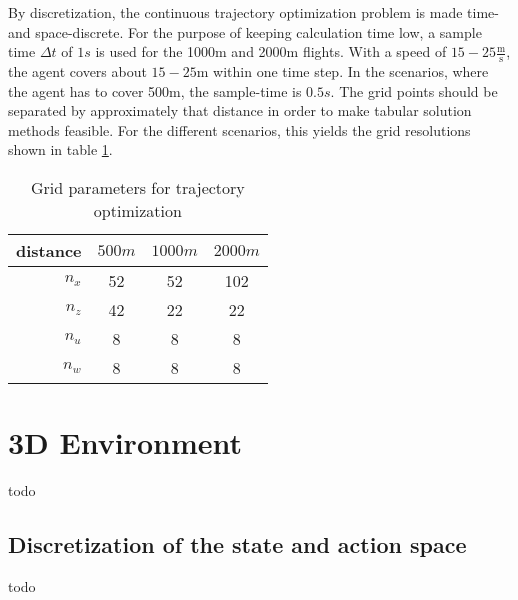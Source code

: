 By discretization, the continuous trajectory optimization problem is made time- and space-discrete. For the purpose of keeping calculation time low, a sample time $\Delta t$ of $1s$ is used for the 1000m and 2000m flights. With a speed of $15-25 \frac{\text{m}}{\text{s}}$, the agent covers about $15-25\text{m}$ within one time step. In the scenarios, where the agent has to cover 500m, the sample-time is $0.5s$. The grid points should be separated by approximately that distance in order to make tabular solution methods feasible. For the different scenarios, this yields the grid resolutions shown in table \ref{tab:grids}.
\begin{table}
	\begin{center}
		\begin{tabular}{r|c c c}
			distance & $500m$ & $1000m$ & $2000m$ \\ \hline
			$n_x$ & 52 & 52 & 102 \\
			$n_z$ & 42 & 22 & 22\\
			$n_u$ & 8 & 8 & 8 \\
			$n_w$ & 8 & 8 & 8
		\end{tabular}
		\caption{Grid parameters for trajectory optimization}
		\label{tab:grids}
	\end{center}
\end{table}

\section{3D Environment}

todo

\subsection{Discretization of the state and action space}
\label{sec:disc3d}
todo